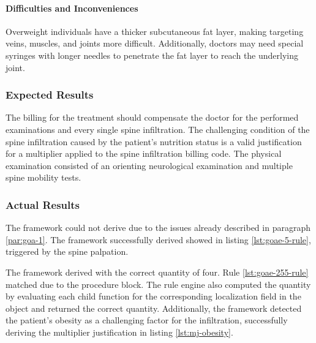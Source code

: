 \paragraph{Difficulties and Inconveniences}
Overweight individuals have a thicker subcutaneous fat layer, making targeting veins, muscles, and joints more difficult.
Additionally, doctors may need special syringes with longer needles to penetrate the fat layer to reach the underlying joint.

\subsubsection{Expected Results}
The billing for the treatment should compensate the doctor for the performed examinations and every single spine infiltration.
The challenging condition of the spine infiltration caused by the patient's nutrition status is a valid justification for a multiplier applied to the spine infiltration billing code.
The physical examination consisted of an orienting neurological examination and multiple spine mobility tests.


\subsubsection{Actual Results}
The framework could not derive  due to the issues already described in paragraph \ref{par:goa-1}.
The framework successfully derived  showed in listing \ref{lst:goae-5-rule}, triggered by the spine palpation.

The framework derived  with the correct quantity of four.
Rule \ref{lst:goae-255-rule} matched due to the  procedure block.
The rule engine also computed the quantity by evaluating each child function for the corresponding localization field in the  object and returned the correct quantity.
Additionally, the framework detected the patient's obesity as a challenging factor for the infiltration,
successfully deriving the multiplier justification in listing \ref{lst:mj-obesity}.








